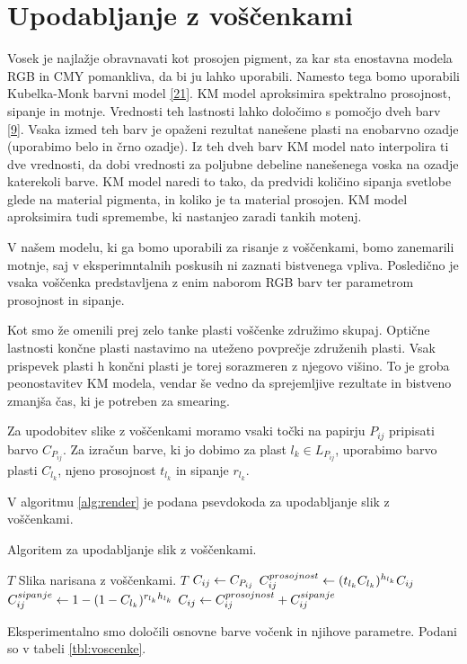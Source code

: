 \section{Upodabljanje z voščenkami}
Vosek je najlažje obravnavati kot prosojen pigment, za kar sta enostavna modela RGB in CMY pomankliva, da bi ju lahko uporabili. Namesto tega bomo uporabili Kubelka-Monk barvni model \ref{21}. KM model aproksimira spektralno prosojnost, sipanje in motnje. Vrednosti teh lastnosti lahko določimo s pomočjo dveh barv \ref{9}. Vsaka izmed teh barv je opaženi rezultat nanešene plasti na enobarvno ozadje (uporabimo belo in črno ozadje). Iz teh dveh barv KM model nato interpolira ti dve vrednosti, da dobi vrednosti za poljubne debeline nanešenega voska na ozadje katerekoli barve. KM model naredi to tako, da predvidi količino sipanja svetlobe glede na material pigmenta, in koliko je ta material prosojen. KM model aproksimira tudi spremembe, ki nastanjeo zaradi tankih motenj.

V našem modelu, ki ga bomo uporabili za risanje z voščenkami, bomo zanemarili motnje, saj v eksperimntalnih poskusih ni zaznati bistvenega vpliva. Posledično je vsaka voščenka predstavljena z enim naborom RGB barv ter parametrom prosojnost in sipanje.

Kot smo že omenili prej zelo tanke plasti voščenke združimo skupaj. Optične lastnosti končne plasti nastavimo na uteženo povprečje združenih plasti. Vsak prispevek plasti h končni plasti je torej sorazmeren z njegovo višino. To je groba peonostavitev KM modela, vendar še vedno da sprejemljive rezultate in bistveno zmanjša čas, ki je potreben za smearing.

Za upodobitev slike z voščenkami moramo vsaki točki na papirju $P_{ij}$ pripisati barvo $C_{P_{ij}}$. Za izračun barve, ki jo dobimo za plast $l_k \in L_{P_{ij}}$, uporabimo barvo plasti $C_{l_k}$, njeno prosojnost $t_{l_k}$ in sipanje $r_{l_k}$.

V algoritmu \ref{alg:render} je podana psevdokoda za upodabljanje slik z voščenkami.

%
\begin{algorithm}[htb]
\caption{Algoritem za upodabljanje slik z voščenkami.}
\label{alg:render}
\begin{algorithmic}[1]
\Require $T$
\Ensure Slika narisana z voščenkami.
 {$T$}
    \State $C_{ij} \gets C_{P_{ij}}$
      \State $C_{ij}^{prosojnost} \gets (t_{l_k} C_{l_k})^{h_{l_k}} C_{ij}$
      \State $C_{ij}^{sipanje} \gets 1 - (1 - C_{l_k})^{r_{l_k} h_{l_k}}$
      \State $C_{ij} \gets C_{ij}^{prosojnost} + C_{ij}^{sipanje}$
    \EndFor
  \EndFor
\EndFunction
\end{algorithmic}
\end{algorithm}
%
Eksperimentalno smo določili osnovne barve vočenk in njihove parametre. Podani so v tabeli \ref{tbl:voscenke}.

